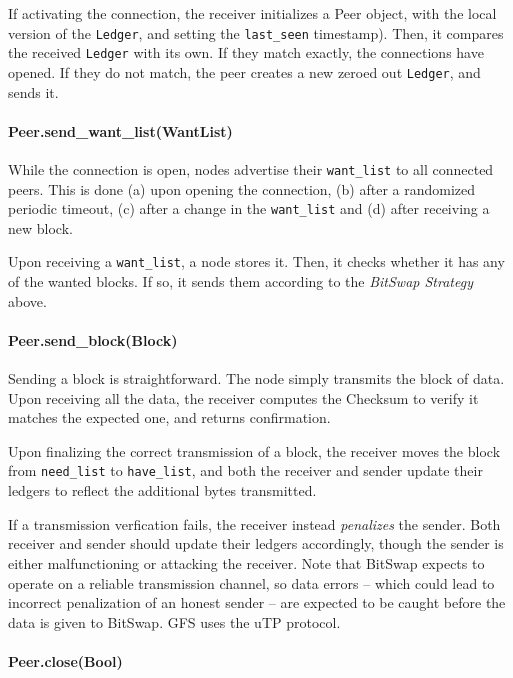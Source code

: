\documentclass{sig-alternate}
\begin{document}
If activating the connection, the receiver initializes a Peer object, with the
local version of the \texttt{Ledger}, and setting the \texttt{last\_seen}
timestamp). Then, it compares the received
\texttt{Ledger} with its own. If they match exactly, the connections have
opened. If they do not match, the peer creates a new zeroed out
\texttt{Ledger}, and sends it.


\paragraph{Peer.send\_want\_list(WantList)}

While the connection is open, nodes advertise their
\texttt{want\_list} to all connected peers. This is done (a) upon opening the
connection, (b) after a randomized periodic timeout, (c) after a change in
the \texttt{want\_list} and (d) after receiving a new block.

Upon receiving a \texttt{want\_list}, a node stores it. Then, it checks whether
it has any of the wanted blocks. If so, it sends them according to the
\textit{BitSwap Strategy} above.

\paragraph{Peer.send\_block(Block)}

Sending a block is straightforward. The node simply transmits the block of
data. Upon receiving all the data, the receiver computes the Checksum to
verify it matches the expected one, and returns confirmation.

Upon finalizing the correct transmission of a block, the receiver moves the
block from \texttt{need\_list} to \texttt{have\_list}, and both the receiver
and sender update their ledgers to reflect the additional bytes transmitted.

If a transmission verfication fails, the receiver instead \textit{penalizes}
the sender. Both receiver and sender should update their ledgers accordingly,
though the sender is either malfunctioning or attacking the receiver. Note that
BitSwap expects to operate on a reliable transmission channel, so data errors
-- which could lead to incorrect penalization of an honest sender -- are
expected to be caught before the data is given to BitSwap. GFS uses the uTP
protocol.

\paragraph{Peer.close(Bool)}
\end{document}
